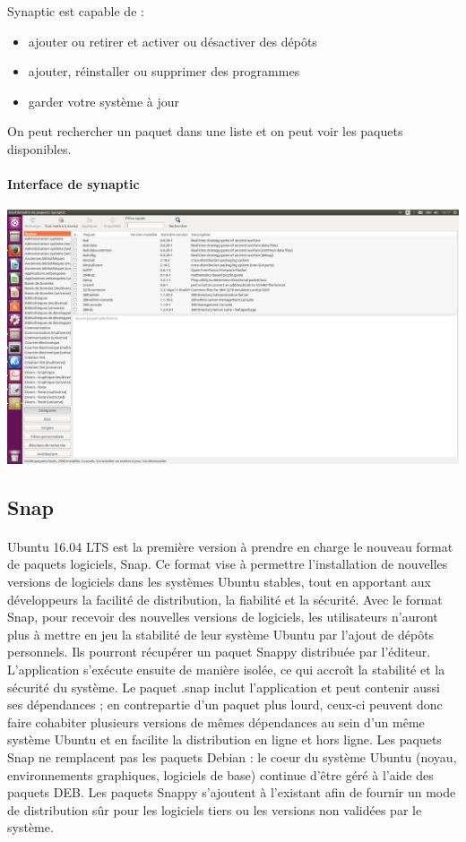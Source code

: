 \documentclass[a4paper,10pt]{article}
\begin{document}
Synaptic est capable de :
\begin{itemize}
\item ajouter ou retirer et activer ou désactiver des dépôts 
\item ajouter, réinstaller ou supprimer des programmes 
\item garder votre système à jour
\end{itemize}
On peut rechercher un paquet dans une liste et on peut voir les paquets disponibles.
\begin{center}
\paragraph{Interface de synaptic}
\includegraphics[width=1\textwidth]{synaptic.png}
\end{center}

\subsection{Snap}
\paragraph{}
Ubuntu 16.04 LTS est la première version à prendre en charge le nouveau format de paquets logiciels, Snap. Ce format vise à permettre l'installation de nouvelles versions de logiciels dans les systèmes Ubuntu stables, tout en apportant
aux développeurs la facilité de distribution, la fiabilité et la sécurité.
Avec le format Snap, pour recevoir des nouvelles versions de logiciels, les utilisateurs n'auront plus à mettre en jeu la stabilité de leur système Ubuntu par l'ajout de dépôts personnels. Ils pourront récupérer un paquet 
Snappy distribuée par l'éditeur. L'application s'exécute ensuite de manière isolée, ce qui accroît la stabilité et la sécurité du système. Le paquet .snap inclut l'application et peut contenir aussi ses dépendances ; 
en contrepartie d'un paquet plus lourd, ceux-ci peuvent donc faire cohabiter plusieurs versions de mêmes dépendances au sein d'un même système Ubuntu et en facilite la distribution en ligne et hors ligne.
Les paquets Snap ne remplacent pas les paquets Debian : le coeur du système Ubuntu (noyau, environnements graphiques, logiciels de base) continue d'être géré à l'aide des paquets DEB. 
Les paquets Snappy s'ajoutent à l'existant afin de fournir un mode de distribution sûr pour les logiciels tiers ou les versions non validées par le système.
\end{document}
